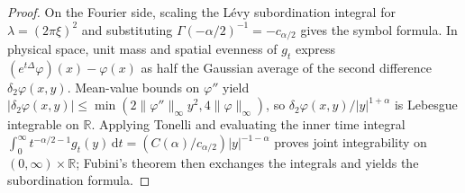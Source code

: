 \begin{proof}
\leanok
On the Fourier side, scaling the L\'evy subordination integral for $\lambda = (2\pi\xi)^2$ and substituting $\Gamma(-\alpha/2)^{-1} = -c_{\alpha/2}$ gives the symbol formula. In physical space, unit mass and spatial evenness of $g_t$ express $(e^{t\Delta}\varphi)(x) - \varphi(x)$ as half the Gaussian average of the second difference $\delta_2 \varphi(x, y)$. Mean-value bounds on $\varphi''$ yield $\lvert \delta_2 \varphi(x, y) \rvert \le \min(2 \lVert \varphi'' \rVert_\infty y^2, 4 \lVert \varphi \rVert_\infty)$, so $\delta_2 \varphi(x, y) / \lvert y \rvert^{1+\alpha}$ is Lebesgue integrable on $\mathbb{R}$. Applying Tonelli and evaluating the inner time integral $\int_0^\infty t^{-\alpha/2 - 1} g_t(y)\, \mathrm{d}t = (C(\alpha) / c_{\alpha/2}) \lvert y \rvert^{-1-\alpha}$ proves joint integrability on $(0, \infty) \times \mathbb{R}$; Fubini's theorem then exchanges the integrals and yields the subordination formula.
\end{proof}
